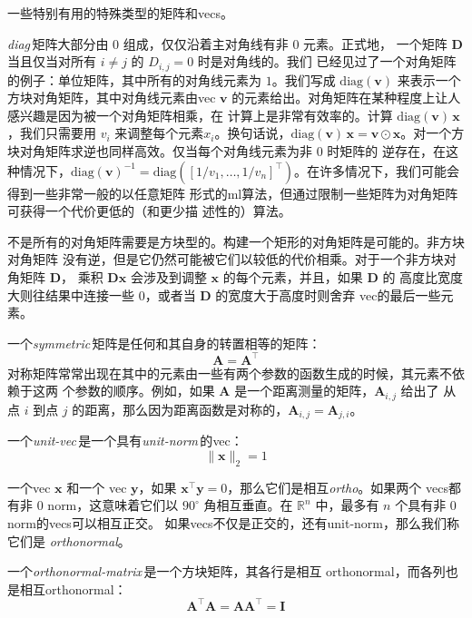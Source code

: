 一些特别有用的特殊类型的矩阵和\gls*{vecs}。

\emph{\gls{diag}}\,矩阵大部分由 $0$ 组成，仅仅沿着主对角线有非 $0$ 元素。正式地，
一个矩阵 $\pmb{D}$ 当且仅当对所有 $i \neq j$ 的 $D_{i,j} = 0$ 时是对角线的。我们
已经见过了一个对角矩阵的例子：单位矩阵，其中所有的对角线元素为 $1$。我们写成
$\mathrm{diag}(\pmb{v})$ 来表示一个方块对角矩阵，其中对角线元素由\gls*{vec}
$\pmb{v}$ 的元素给出。对角矩阵在某种程度上让人感兴趣是因为被一个对角矩阵相乘，在
计算上是非常有效率的。计算 $\mathrm{diag}(\pmb{v})\,\pmb{x}$，我们只需要用 $v_i$
来调整每个元素$x_i$。换句话说，$\mathrm{diag}(\pmb{v})\,\pmb{x} = \pmb{v} \odot
\pmb{x}$。对一个方块对角矩阵求逆也同样高效。仅当每个对角线元素为非 $0$ 时矩阵的
逆存在，在这种情况下，$\mathrm{diag}(\pmb{v})^{-1} = \mathrm{diag}([1/v_1,
  \ldots, 1/v_n]^{\top})$。在许多情况下，我们可能会得到一些非常一般的以任意矩阵
形式的\gls*{ml}算法，但通过限制一些矩阵为对角矩阵可获得一个代价更低的（和更少描
  述性的）算法。

不是所有的对角矩阵需要是方块型的。构建一个矩形的对角矩阵是可能的。非方块对角矩阵
没有逆，但是它仍然可能被它们以较低的代价相乘。对于一个非方块对角矩阵 $\pmb{D}$，
乘积 $\pmb{D}\pmb{x}$ 会涉及到调整 $\pmb{x}$ 的每个元素，并且，如果 $\pmb{D}$ 的
高度比宽度大则往结果中连接一些 $0$，或者当 $\pmb{D}$ 的宽度大于高度时则舍弃
\gls*{vec}的最后一些元素。

一个\emph{\gls{symmetric}}\,矩阵是任何和其自身的转置相等的矩阵：
\begin{equation}
  \pmb{A} = \pmb{A}^{\top}
\end{equation}
对称矩阵常常出现在其中的元素由一些有两个参数的函数生成的时候，其元素不依赖于这两
个参数的顺序。例如，如果 $\pmb{A}$ 是一个距离测量的矩阵，$\pmb{A}_{i,j}$ 给出了
从点 $i$ 到点 $j$ 的距离，那么因为距离函数是对称的，$\pmb{A}_{i,j} =
\pmb{A}_{j,i}$。

一个\emph{\gls{unit-vec}}\,是一个具有\emph{\gls{unit-norm}}\,的\gls*{vec}：
\begin{equation}
  \|\pmb{x}\|_2 = 1
\end{equation}

一个\gls*{vec} $\pmb{x}$ 和一个 \gls*{vec} $\pmb{y}$，如果
$\pmb{x}^{\top}\pmb{y} = 0$，那么它们是相互\emph{\gls{ortho}}。如果两个
\gls*{vecs}都有非 $0$ \gls*{norm}，这意味着它们以 $90^{\circ}$ 角相互垂直。在
$\mathbb{R}^n$ 中，最多有 $n$ 个具有非 $0$ \gls*{norm}的\gls*{vecs}可以相互正交。
如果\gls*{vecs}不仅是正交的，还有\gls*{unit-norm}，那么我们称它们是
\emph{\gls{orthonormal}}。

一个\emph{\gls{orthonormal-matrix}}\,是一个方块矩阵，其各行是相互
\gls*{orthonormal}，而各列也是相互\gls*{orthonormal}：
\begin{equation}
  \pmb{A}^{\top}\pmb{A} = \pmb{A}\pmb{A}^{\top} = \pmb{I}
\end{equation}


